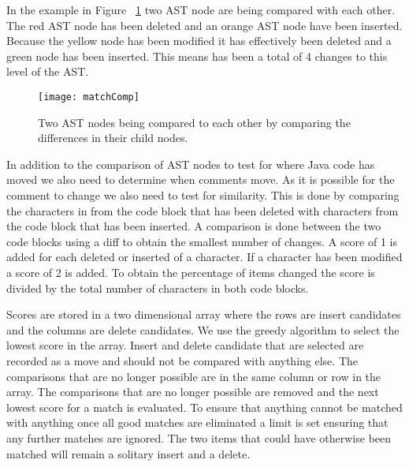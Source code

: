 In the example in Figure ~\ref{fig:matchComp} two AST node are being compared with each other. The red AST node has been deleted and an orange AST node have been inserted. Because the yellow node has been modified it has effectively been deleted and a green node has been inserted. This means has been a total of 4 changes to this level of the AST. 

\begin{figure}[!t]
 \begin{center}
 \texttt{[image: matchComp]}
 \end{center}
 \caption{Two AST nodes being compared to each other by comparing the differences in their child nodes.}
 \label{fig:matchComp}
\end{figure}

In addition to the comparison of AST nodes to test for where Java code has moved we also need to determine when comments move.  As it is possible for the comment to change we also need to test for similarity.  This is done by comparing the characters in from the code block that has been deleted with characters from the code block that has been inserted.  A comparison is done between the two code blocks using a diff to obtain the smallest number of changes. A score of 1 is added for each deleted or inserted of a character.  If a character has been modified a score of 2 is added. To obtain the percentage of items changed the score is divided by the total number of characters in both code blocks.

Scores are stored in a two dimensional array where the rows are insert candidates and the columns are delete candidates.  We use the greedy algorithm to select the lowest score in the array.  Insert and delete candidate that are selected are recorded as a move and should not be compared with anything else. The comparisons that are no longer possible are in the same column or row in the array.  The comparisons that are no longer possible are removed and the next lowest score for a match is evaluated.  To ensure that anything cannot be matched with anything once all good matches are eliminated a limit is set ensuring that any further matches are ignored.  The two items that could have otherwise been matched will remain a solitary insert and a delete.

